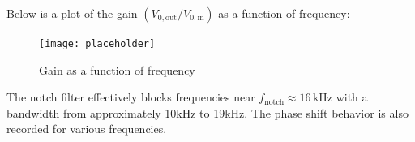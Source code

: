 \documentclass{article}
\begin{document}
Below is a plot of the gain \( (V_{0,\text{out}}/V_{0,\text{in}}) \) 
as a function of frequency:

\begin{figure}[H]
    \centering
    \texttt{[image: placeholder]} %
    \caption{Gain as a function of frequency}
\end{figure}

The notch filter effectively blocks frequencies near 
\( f_{\text{notch}} \approx 16\,\text{kHz} \) with a bandwidth 
from approximately 10kHz to 19kHz. The phase shift behavior is 
also recorded for various frequencies.
\end{document}
